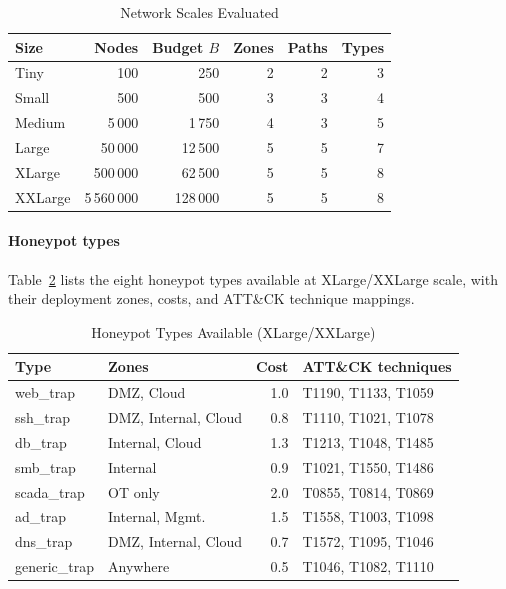\documentclass[journal]{IEEEtran}
\begin{document}
\begin{table}[t]
\caption{Network Scales Evaluated}
\label{tab:scales}
\centering
\renewcommand{\arraystretch}{1.2}
\begin{tabular}{lrrrrr}
\toprule
Size & Nodes & Budget $B$ & Zones & Paths & Types \\
\midrule
Tiny    & 100            & 250      & 2 & 2 & 3 \\
Small   & 500            & 500      & 3 & 3 & 4 \\
Medium  & 5\,000         & 1\,750   & 4 & 3 & 5 \\
Large   & 50\,000        & 12\,500  & 5 & 5 & 7 \\
XLarge  & 500\,000       & 62\,500  & 5 & 5 & 8 \\
XXLarge & 5\,560\,000    & 128\,000 & 5 & 5 & 8 \\
\bottomrule
\end{tabular}
\end{table}

\paragraph{Honeypot types}
Table~\ref{tab:hptypes} lists the eight honeypot types available at
XLarge/XXLarge scale, with their deployment zones, costs, and
ATT\&CK technique mappings.

\begin{table}[t]
\caption{Honeypot Types Available (XLarge/XXLarge)}
\label{tab:hptypes}
\centering
\renewcommand{\arraystretch}{1.2}
\begin{tabular}{llrl}
\toprule
Type & Zones & Cost & ATT\&CK techniques \\
\midrule
web\_trap    & DMZ, Cloud           & 1.0 & T1190, T1133, T1059 \\
ssh\_trap    & DMZ, Internal, Cloud & 0.8 & T1110, T1021, T1078 \\
db\_trap     & Internal, Cloud      & 1.3 & T1213, T1048, T1485 \\
smb\_trap    & Internal             & 0.9 & T1021, T1550, T1486 \\
scada\_trap  & OT only              & 2.0 & T0855, T0814, T0869 \\
ad\_trap     & Internal, Mgmt.      & 1.5 & T1558, T1003, T1098 \\
dns\_trap    & DMZ, Internal, Cloud & 0.7 & T1572, T1095, T1046 \\
generic\_trap& Anywhere             & 0.5 & T1046, T1082, T1110 \\
\bottomrule
\end{tabular}
\end{table}
\end{document}
